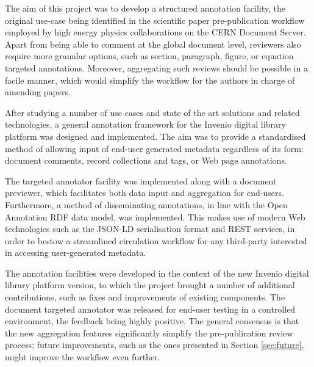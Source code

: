 
The aim of this project was to develop a structured annotation facility, the
original use-case being identified in the scientific paper pre-publication
workflow employed by high energy physics collaborations on the CERN Document
Server. Apart from being able to comment at the global document level,
reviewers also require more granular options, such as section, paragraph,
figure, or equation targeted annotations. Moreover, aggregating such
reviews should be possible in a facile manner, which would simplify the
workflow for the authors in charge of amending papers.

After studying a number of use cases and state of the art solutions and related
technologies, a general annotation framework for the Invenio digital library
platform was designed and implemented. The aim was to provide a standardised
method of allowing input of end-user generated metadata regardless of its form:
document comments, record collections and tags, or Web page annotations.

The targeted annotator facility was implemented along with a document
previewer, which facilitates both data input and aggregation for end-users.
Furthermore, a method of disseminating annotations, in line with the Open
Annotation RDF data model, was implemented. This makes use of modern Web
technologies such as the JSON-LD serialisation format and REST services, in
order to bestow a streamlined circulation workflow for any third-party
interested in accessing user-generated metadata.

The annotation facilities were developed in the context of the new Invenio
digital library platform version, to which the project brought a number of
additional contributions, such as fixes and improvements of existing
components.  The document targeted annotator was released for end-user testing
in a controlled environment, the feedback being highly positive. The general
consensus is that the new aggregation features significantly simplify the
pre-publication review process; future improvements, such as the ones presented
in Section \ref{sec:future}, might improve the workflow even further.
